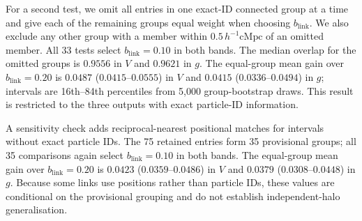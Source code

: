 \documentclass[usenatbib]{mnras}
\begin{document}
For a second test, we omit all entries in one exact-ID connected group
at a time and give each of the remaining groups equal weight when
choosing $b_{\mathrm{link}}$. We also exclude any other group with a
member within $0.5\,h^{-1}\mathrm{cMpc}$ of an omitted member. All 33
tests select $b_{\mathrm{link}}=0.10$ in both bands. The median overlap
for the omitted groups is $0.9556$ in $V$ and $0.9621$ in $g$. The equal-group mean gain over
$b_{\mathrm{link}}=0.20$ is $0.0487$ ($0.0415$--$0.0555$) in $V$ and $0.0415$
($0.0336$--$0.0494$) in $g$; intervals are 16th--84th percentiles from
5,000 group-bootstrap draws. This result is restricted to the three
outputs with exact particle-ID information.

A sensitivity check adds reciprocal-nearest positional matches for
intervals without exact particle IDs. The 75 retained entries form 35
provisional groups; all 35 comparisons again select $b_{\mathrm{link}}=0.10$
in both bands. The equal-group mean gain over $b_{\mathrm{link}}=0.20$ is $0.0423$
($0.0359$--$0.0486$) in $V$ and $0.0379$ ($0.0308$--$0.0448$) in $g$.
Because some links use positions rather than particle IDs, these values
are conditional on the provisional grouping and do not establish
independent-halo generalisation.
\end{document}
